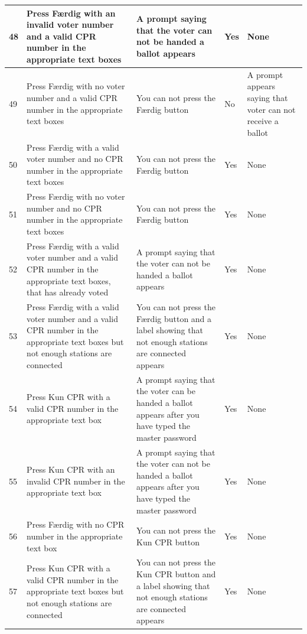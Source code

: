 \documentclass[a4paper]{report}
\begin{document}
\begin{longtable}{|p{5mm}|p{}|p{}|p{}|p{}|}
 \\\hline
48 & Press F\ae rdig with an invalid voter number and a valid CPR number in the appropriate text boxes & A prompt saying that the voter can not be handed a ballot appears & Yes & None 

\\\hline
49 & Press F\ae rdig with no voter number and a valid CPR number in the appropriate text boxes & You can not press the F\ae rdig button & No & A prompt appears saying that voter can not receive a ballot

\\\hline
50 & Press F\ae rdig with a valid voter number and no CPR number in the appropriate text boxes & You can not press the F\ae rdig button & Yes & None

\\\hline
51 & Press F\ae rdig with no voter number and no CPR number in the appropriate text boxes & You can not press the F\ae rdig button & Yes & None

\\\hline
52 & Press F\ae rdig with a valid voter number and a valid CPR number in the appropriate text boxes, that has already voted & A prompt saying that the voter can not be handed a ballot appears & Yes & None 

\\\hline
53 & Press F\ae rdig with a valid voter number and a valid CPR number in the appropriate text boxes but not enough stations are connected & You can not press the F\ae rdig button and a label showing that not enough stations are connected appears & Yes & None 

 \\\hline
54 & Press Kun CPR with a valid CPR number in the appropriate text box & A prompt saying that the voter can be handed a ballot appears after you have typed the master password & Yes & None 

 \\\hline
55 & Press Kun CPR with an invalid CPR number in the appropriate text box & A prompt saying that the voter can not be handed a ballot appears after you have typed the master password & Yes & None 

\\\hline
56 & Press F\ae rdig with no CPR number in the appropriate text box & You can not press the Kun CPR button & Yes & None

\\\hline
57 & Press Kun CPR with a valid CPR number in the appropriate text boxes but not enough stations are connected & You can not press the Kun CPR button and a label showing that not enough stations are connected appears & Yes & None 


\end{longtable}
\end{document}
